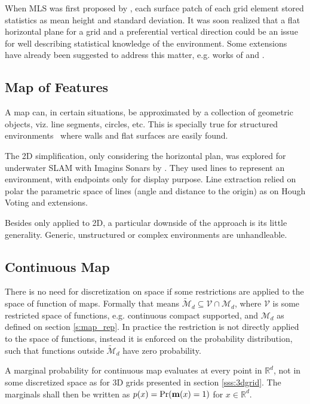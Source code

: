 When MLS was first proposed by \citet{triebel2006multi}, each surface patch of
each grid element stored statistics as mean height and standard deviation. It
was soon realized that a flat horizontal plane for a grid and a preferential
vertical direction could be an issue for well describing statistical knowledge
of the environment. Some extensions have already been suggested to address this
matter, e.g. works of \citet{rivadeneyra2011probabilistic} and
\citet{Schwendner2013}.

\subsection{Map of Features}

A map can, in certain situations, be approximated by a collection of geometric
objects, viz. line segments, circles, etc. This is specially true for structured
environments~\cite{Ribas2006} where walls and flat surfaces are easily found.

The 2D simplification, only considering the horizontal plan, was explored for
underwater SLAM with Imagins Sonars by \citet{ribas2010underwater}. They used
lines to represent an environment, with endpoints only for display purpose. Line
extraction relied on polar the parametric space of lines (angle and distance to
the origin) as on Hough Voting and extensions.

Besides only applied to 2D, a particular downside of the approach is its little
generality. Generic, unstructured or complex environments are unhandleable.


\subsection{Continuous Map}

There is no need for discretization on space if some restrictions are applied to
the space of function of maps. Formally that means
$\tilde{\mathcal{M}}_d\subseteq\mathcal{V}\cap\mathcal{M}_d$, where $\mathcal{V}$
is some restricted space of functions, e.g. continuous compact supported, and
$\mathcal{M}_d$ as defined on section \ref{s:map_rep}. In practice the
restriction is not directly applied to the space of functions, instead it is
enforced on the probability distribution, such that functions outside
$\tilde{\mathcal{M}}_d$ have zero probability.

A marginal probability for continuous map evaluates at every point in
$\mathbb{R}^d$, not in some discretized space as for 3D grids presented in
section \ref{sss:3dgrid}. The marginals shall then be written as
$p(x)=\Pr(\mathrm{\mathbf{m}}(x)=1)$ for $x\in\mathbb{R}^d$.


